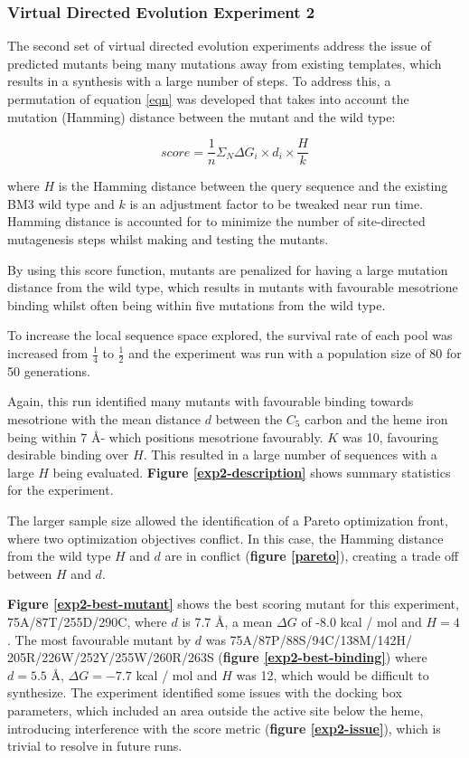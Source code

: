 \documentclass{article}
\begin{document}
\subsubsection{Virtual Directed Evolution Experiment 2}

The second set of virtual directed evolution experiments address the issue of predicted mutants being many mutations away from existing templates, which results in a synthesis with a large number of steps. To address this, a permutation of equation \ref{eqn} was developed that takes into account the mutation (Hamming) distance between the mutant and the wild type:

\begin{equation}\label{eqn2}
	score = \frac{1}{n}\Sigma _{N} \Delta G_{i} \times d_{i} \times \frac{H}{k}
\end{equation}

where $H$ is the Hamming distance between the query sequence and the existing BM3 wild type and $k$ is an adjustment factor to be tweaked near run time.
Hamming distance is accounted for to minimize the number of site-directed mutagenesis steps whilst making and testing the mutants. 
\par
By using this score function, mutants are penalized for having a large mutation distance from the wild type, which results in mutants with favourable mesotrione binding whilst often being within five mutations from the wild type.
\par 
To increase the local sequence space explored, the survival rate of each pool was increased from $\frac{1}{4}$ to $\frac{1}{2}$ and the experiment was run with a population size of 80 for 50 generations.
\par
Again, this run identified many mutants with favourable binding towards mesotrione with the mean distance $d$ between the $C_5$ carbon and the heme iron being within 7 \AA - which positions mesotrione favourably. $K$ was 10, favouring desirable binding over $H$. This resulted in a large number of sequences with a large $H$ being evaluated. \textbf{Figure \ref{exp2-description}} shows summary statistics for the experiment. 
\par
The larger sample size allowed the identification of a Pareto optimization front, where two optimization objectives conflict. In this case, the Hamming distance from the wild type $H$ and $d$ are in conflict (\textbf{figure \ref{pareto}}), creating a trade off between $H$ and $d$. 
\par 
\textbf{Figure \ref{exp2-best-mutant}} shows the best scoring mutant for this experiment, 75A/87T/255D/290C, where $d$ is 7.7 \AA, a mean $\Delta G$ of -8.0 kcal / mol and $H = 4 $. The most favourable mutant by $d$ was 75A/87P/88S/94C/138M/142H/ 205R/226W/252Y/255W/260R/263S (\textbf{figure \ref{exp2-best-binding}}) where $d = 5.5$ \AA, $\Delta G = -7.7$ kcal / mol and $H$ was 12, which would be difficult to synthesize. The experiment identified some issues with the docking box parameters, which included an area outside the active site below the heme, introducing interference with the score metric (\textbf{figure \ref{exp2-issue}}), which is trivial to resolve in future runs.
\end{document}
